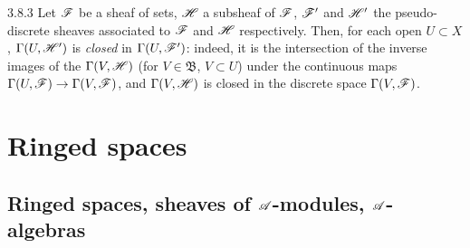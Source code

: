 \begin{env}{3.8.3}
\label{env-0.3.8.3}
Let $\mathscr{F}$ be a sheaf of sets, $\mathscr{H}$ a subsheaf of $\mathscr{F}$, $\mathscr{F}'$ and
$\mathscr{H}'$ the pseudo-discrete sheaves associated to $\mathscr{F}$ and $\mathscr{H}$
respectively. Then, for each open $U\subset X$, $\Gamma(U,\mathscr{H}')$ is
\emph{closed} in $\Gamma(U,\mathscr{F}')$: indeed, it is the intersection of the
inverse images of the $\Gamma(V,\mathscr{H})$ (for $V\in\mathfrak{B}$, $V\subset U$)
under the continuous maps $\Gamma(U,\mathscr{F})\to\Gamma(V,\mathscr{F})$, and
$\Gamma(V,\mathscr{H})$ is closed in the discrete space $\Gamma(V,\mathscr{F})$.
\end{env}

\section{Ringed spaces}
\label{0-prelim-4}

\subsection{Ringed spaces, sheaves of $\mathscr{A}$-modules, $\mathscr{A}$-algebras}
\label{0-prelim-4.1}

